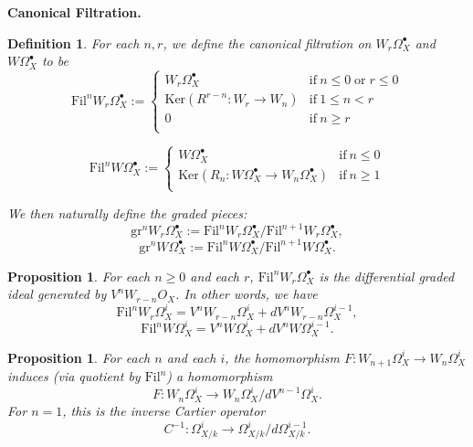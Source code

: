 \documentclass[a4paper,12pt,twoside]{report}
\newtheorem{definition}[theorem]{Definition}
\newtheorem{proposition}[theorem]{Proposition}
\newcommand{\Fil}{\mathrm{Fil}}
\newcommand{\gr}{\mathrm{gr}}
\newcommand{\Ker}{\mathrm{Ker}}
\begin{document}
\begin{appendices}
    {\bf Canonical Filtration.}
    \begin{definition}\label{CanFildef}
    For each $n,r$, we define the canonical filtration on $W_r\Omega^\bullet_X$ and $W\Omega_{X}^\bullet$ to be
    \begin{equation}
    \label{CanFil}\Fil^nW_r\Omega^\bullet_X:=\begin{cases}
        W_r\Omega_X^\bullet &\text{if}\ n\leqslant 0  \;\text{or}\; r\leqslant 0\\
        \Ker(R^{r-n}: W_r\rightarrow W_n) &\text{if}\ 1\leqslant n < r\\
        0 &\text{if}\ n\geqslant r\\
    \end{cases}
    \end{equation}
    
    \[\Fil^nW\Omega^\bullet_X:=\begin{cases}
        W\Omega_X^\bullet &\text{if}\ n\leqslant 0 \\
        \Ker(R_n: W\Omega^\bullet_X\rightarrow W_n\Omega^\bullet_{X}) &\text{if}\ n\geqslant 1 \\
    \end{cases}\]
    
    We then naturally define the graded pieces: 
    \[\gr^nW_r\Omega^\bullet_{X}:=\Fil^nW_r\Omega^\bullet_{X}/\Fil^{n+1}W_r\Omega^\bullet_{X},\]
    \[\gr^nW\Omega^\bullet_{X}:=\Fil^nW\Omega^\bullet_{X}/\Fil^{n+1}W\Omega^\bullet_{X}.\]
    
    \end{definition}
    \begin{proposition}
        For each $n\geqslant 0$ and each $r$, $\Fil^nW_r\Omega^\bullet_X$ 
        is the differential graded ideal generated by $V^nW_{r-n}O_X$. 
        In other words, we have 
        \[\Fil^nW_r\Omega_X^i=V^nW_{r-n}\Omega_X^i+dV^nW_{r-n}\Omega_X^{i-1},\]
        \[\Fil^nW\Omega_X^i=V^nW\Omega_X^i+dV^nW\Omega_X^{i-1}.\]
    \end{proposition}
    
    \begin{proposition}
        For each $n$ and each $i$, the homomorphism $F:W_{n+1}\Omega^i_{X}\rightarrow W_n\Omega^i_{X}$ induces 
        (via quotient by $\Fil^{n}$) a homomorphism
        \[F: W_n\Omega^i_X\rightarrow W_n\Omega^i_{X}/dV^{n-1}\Omega^{i}_X.\]
        For $n=1$, this is the inverse Cartier operator
        \[C^{-1}:\Omega^i_{X/k}\rightarrow \Omega^i_{X/k}/d\Omega^{i-1}_{X/k}.\]
    \end{proposition}
    

\end{appendices}
\end{document}
